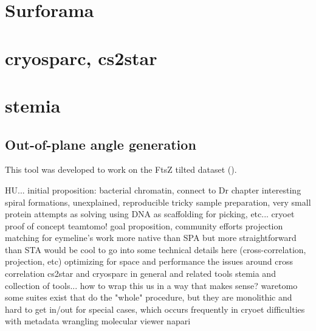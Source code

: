 \section{Surforama}

\section{cryosparc, cs2star}

\section{stemia}

\subsection{Out-of-plane angle generation}\label{stemia_angles}
This tool was developed to work on the FtsZ tilted dataset ().

\begin{outline}
\1 HU...
    \2 initial proposition: bacterial chromatin, connect to Dr chapter
    \2 interesting spiral formations, unexplained, reproducible
    \2 tricky sample preparation, very small protein
        \3 attempts as solving using DNA as scaffolding for picking, etc...
        \3 cryoet proof of concept
\1 teamtomo!
    \2 goal proposition, community efforts
\1 projection matching for eymeline's work
    \2 more native than SPA but more straightforward than STA
    \2 would be cool to go into some technical details here (cross-correlation, projection, etc)
    \2 optimizing for space and performance
    \2 the issues around cross correlation
\1 cs2star and cryosparc in general and related tools
\1 stemia and collection of tools... how to wrap this us in a way that makes sense?
\1 waretomo
    \2 some suites exist that do the "whole" procedure, but they are monolithic and hard to get in/out for special cases, which occurs frequently in cryoet
    \2 difficulties with metadata wrangling
\1 molecular viewer napari
\end{outline}
